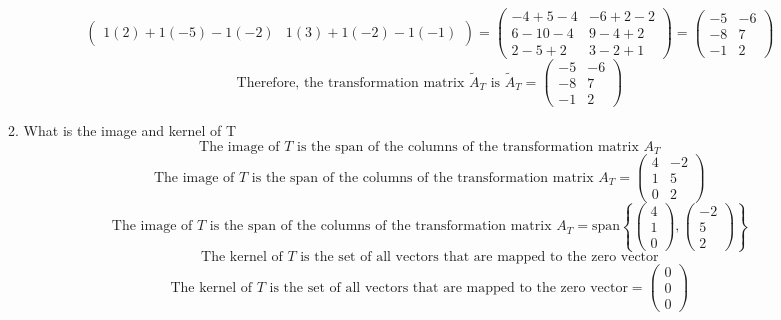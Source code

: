 \documentclass[a3paper,12pt]{extarticle} %
\begin{document}
\begin{enumerate}
\begin{enumerate}
\[\begin{pmatrix}
                1(2) + 1(-5) - 1(-2) & 1(3) + 1(-2) - 1(-1)
            \end{pmatrix} = \begin{pmatrix}
                -4 + 5 - 4 & -6 + 2 - 2 \\
                6 - 10 - 4 & 9 - 4 + 2 \\
                2 - 5 + 2 & 3 - 2 + 1
            \end{pmatrix} = \begin{pmatrix}
                -5 & -6 \\
                -8 & 7 \\
                -1 & 2
            \end{pmatrix}
        \]
        \[
            \text{Therefore, the transformation matrix } \tilde{A}_T \text{ is } \tilde{A}_T = \begin{pmatrix} -5 & -6 \\ -8 & 7 \\ -1 & 2 \end{pmatrix}
        \]
        \item What is the image and kernel of T
        \[
            \text{The image of } T \text{ is the span of the columns of the transformation matrix } A_T
        \]
        \[
            \text{The image of } T \text{ is the span of the columns of the transformation matrix } A_T = \begin{pmatrix} 4 & -2 \\ 1 & 5 \\ 0 & 2 \end{pmatrix}
        \]
        \[
            \text{The image of } T \text{ is the span of the columns of the transformation matrix } A_T = \text{span}\left\{ \begin{pmatrix} 4 \\ 1 \\ 0 \end{pmatrix}, \begin{pmatrix} -2 \\ 5 \\ 2 \end{pmatrix} \right\}
        \]
        \[
            \text{The kernel of } T \text{ is the set of all vectors that are mapped to the zero vector}
        \]
        \[
            \text{The kernel of } T \text{ is the set of all vectors that are mapped to the zero vector} = \begin{pmatrix} 0 \\ 0 \\ 0 \end{pmatrix}
\]
\end{enumerate}
\end{enumerate}
\end{document}
